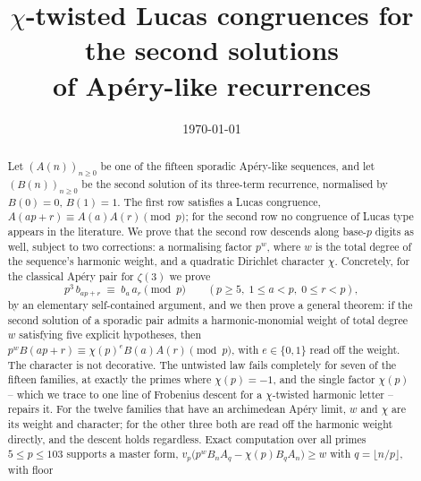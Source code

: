\documentclass[11pt,reqno]{amsart}
\theoremstyle{plain}
\theoremstyle{definition}
\theoremstyle{remark}
\newcommand{\vp}{v_p}
\numberwithin{equation}{section}
\begin{document}
\title[Lucas congruences for second solutions]
      {$\chi$-twisted Lucas congruences for the second solutions\\ of Ap\'ery-like recurrences}

\author{}

\date{\today}


\begin{abstract}
Let $(A(n))_{n\ge 0}$ be one of the fifteen sporadic Ap\'ery-like sequences, and let
$(B(n))_{n\ge 0}$ be the second solution of its three-term recurrence, normalised by
$B(0)=0$, $B(1)=1$. The first row satisfies a Lucas congruence,
$A(ap+r)\equiv A(a)A(r)\pmod p$; for the second row no congruence of Lucas type appears
in the literature. We prove that the second row descends along base-$p$ digits as well,
subject to two corrections: a normalising factor $p^{w}$, where $w$ is the total degree of
the sequence's harmonic weight, and a quadratic Dirichlet character $\chi$. Concretely, for the
classical Ap\'ery pair for $\zeta(3)$ we prove
\[
  p^{3}\,b_{ap+r}\;\equiv\;b_{a}\,a_{r}\pmod p
  \qquad(p\ge 5,\;1\le a<p,\;0\le r<p),
\]
by an elementary self-contained argument, and we then prove a general theorem: if the
second solution of a sporadic pair admits a harmonic-monomial weight of total degree $w$
satisfying five explicit hypotheses, then $p^{w}B(ap+r)\equiv\chi(p)^{e}B(a)A(r)\pmod p$, with
$e\in\{0,1\}$ read off the weight. The
character is not decorative. The untwisted law fails completely for seven of the fifteen
families, at exactly the primes where $\chi(p)=-1$, and the single factor $\chi(p)$ --
which we trace to one line of Frobenius descent for a $\chi$-twisted harmonic letter --
repairs it. For the twelve families that have an archimedean Ap\'ery limit, $w$ and $\chi$
are its weight and character; for the other three both are read off the harmonic weight
directly, and the descent holds regardless. Exact computation
over all primes $5\le p\le 103$ supports a master form,
$\vp\bigl(p^{w}B_nA_q-\chi(p)B_qA_n\bigr)\ge w$ with $q=\lfloor n/p\rfloor$, with floor

\end{abstract}
\end{document}
